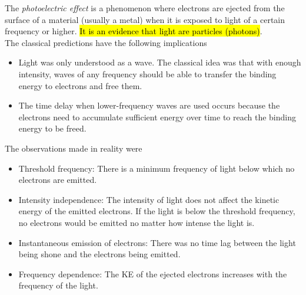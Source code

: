 \documentclass[a4paper,12pt]{article}
\newcommand{\lb}{\\[8pt]}
\begin{document}
The \textit{photoelectric effect} is a phenomenon where electrons are ejected from the surface of a material (usually a metal) when it is exposed to light of a certain frequency or higher. \hl{It is an evidence that light are particles (photons)}.\lb
The classical predictions have the following implications
\begin{itemize}
  \item Light was only understood as a wave. The classical idea was that with enough intensity, waves of any frequency should be able to transfer the binding energy to electrons and free them.
  \item The time delay when lower-frequency waves are used occurs because the electrons need to accumulate sufficient energy over time to reach the binding energy to be freed.
\end{itemize}
The observations made in reality were
\begin{itemize}
  \item Threshold frequency: There is a minimum frequency of light below which no electrons are emitted.
  \item Intensity independence: The intensity of light does not affect the kinetic energy of the emitted electrons. If the light is below the threshold frequency, no electrons would be emitted no matter how intense the light is.
  \item Instantaneous emission of electrons: There was no time lag between the light being shone and the electrons being emitted.
  \item Frequency dependence: The KE of the ejected electrons increases with the frequency of the light.
\end{itemize}
\end{document}
